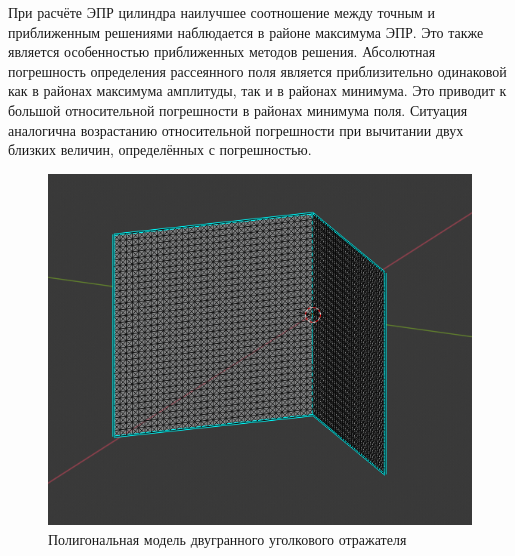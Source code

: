 При расчёте ЭПР цилиндра наилучшее соотношение между точным и приближенным решениями
наблюдается в районе максимума ЭПР. Это также является особенностью приближенных методов
решения. Абсолютная погрешность определения рассеянного поля является приблизительно
одинаковой как в районах максимума амплитуды, так и в районах минимума. Это приводит к
большой относительной погрешности в районах минимума поля. Ситуация аналогична возрастанию
относительной погрешности при вычитании двух близких величин, определённых с погрешностью.


\begin{figure}
    \centering
    \includegraphics[width=0.4\linewidth]{Synopsis/images/ugol_izo}
    \caption{Полигональная модель двугранного уголкового отражателя}
    \label{fig:ugolizo}
\end{figure}


